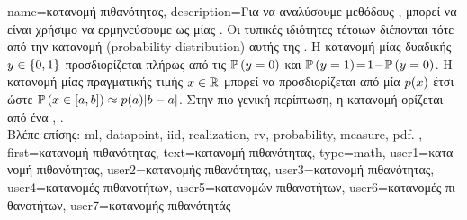 {name={\foreignlanguage{greek}{κατανομή πιθανότητας}},
	description={\foreignlanguage{greek}{Για να αναλύσουμε μεθόδους} 
		, \foreignlanguage{greek}{μπορεί να είναι χρήσιμο να ερμηνεύσουμε}  \foreignlanguage{greek}{ως} 
		  \foreignlanguage{greek}{μίας} . \foreignlanguage{greek}{Οι τυπικές  
		ιδιότητες τέτοιων}  \foreignlanguage{greek}{διέπονται τότε από την κατανομή}   
		(probability distribution) \foreignlanguage{greek}{αυτής της} . \foreignlanguage{greek}{Η κατανομή}  
		\foreignlanguage{greek}{μίας δυαδικής}  $y \in \{0,1\}$ \foreignlanguage{greek}{προσδιορίζεται πλήρως
		από τις}  $\mathbb{P}\left(y = 0\right)$ \foreignlanguage{greek}{και 
		$\mathbb{P}\left(y=1\right)\!=\!1\!-\!\mathbb{P}\left(y=0\right)$. Η κατανομή}  
		\foreignlanguage{greek}{μίας}  \foreignlanguage{greek}{πραγματικής τιμής $x \in \mathbb{R}$ μπορεί να 
		προσδιορίζεται από μία}  $p(x)$ \foreignlanguage{greek}{έτσι ώστε $\mathbb{P}\left( x \in [a,b] \right) \approx  p(a) |b-a|$. 
	    	Στην πιο γενική περίπτωση, η κατανομή}  \foreignlanguage{greek}{ορίζεται από ένα} 
		 \cite{BillingsleyProbMeasure}, \cite{GrayProbBook}.
		\\
	    	\foreignlanguage{greek}{Βλέπε επίσης:} \gls{ml}, \gls{datapoint}, \gls{iid}, \gls{realization}, \gls{rv}, \gls{probability}, \gls{measure}, \gls{pdf}. },
	 first={\foreignlanguage{greek}{κατανομή πιθανότητας}},
	 text={\foreignlanguage{greek}{κατανομή πιθανότητας}},
	 type=math,
	 user1={\foreignlanguage{greek}{κατανομή πιθανότητας}}, %
	 user2={\foreignlanguage{greek}{κατανομής πιθανότητας}}, %
	 user3={\foreignlanguage{greek}{κατανομή πιθανότητας}}, %
	 user4={\foreignlanguage{greek}{κατανομές πιθανοτήτων}}, %
	 user5={\foreignlanguage{greek}{κατανομών πιθανοτήτων}}, %
	 user6={\foreignlanguage{greek}{κατανομές πιθανοτήτων}}, %
	 user7={\foreignlanguage{greek}{κατανομής πιθανότητάς}} %
}

